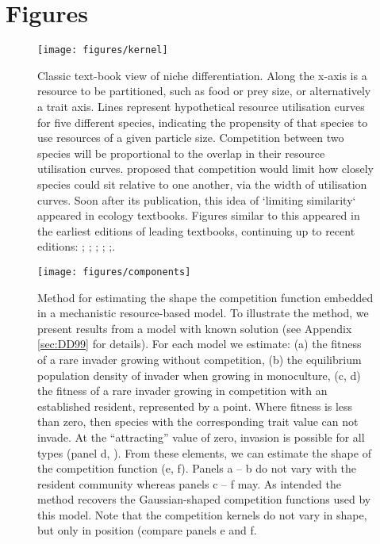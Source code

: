 \documentclass[a4paper,11pt]{article}
\begin{document}
\section{Figures}

\begin{figure}[h]
  \centering
  \texttt{[image: figures/kernel]}
  \caption{Classic text-book view of niche differentiation.  Along the
    x-axis is a resource to be partitioned, such as food or prey size,
    or alternatively a trait axis.  Lines represent hypothetical
    resource utilisation curves for five different species, indicating
    the propensity of that species to use resources of a given particle size.
    Competition between two species will be proportional to
    the overlap in their resource utilisation
    curves. \citet{MacArthur-1967} proposed that competition would
    limit how closely species could sit relative to one another, via
    the width of utilisation curves. Soon after its publication,
    this idea of `limiting similarity` appeared in ecology textbooks.
    Figures similar to this appeared in the earliest
    editions of leading textbooks, continuing up to recent editions:
    \citet[Fig. 7.9]{Begon-1986}; \citet[Fig. 8.29]{Begon-2006};
    \citet[Fig. 12.20]{Krebs-1978}; \citet[????]{ Krebs-2013};
    \citet[Fig. 36.13]{Ricklefs-1973};\citet[Fig. 29.19]{Ricklefs-1999}.}
  \label{fig:competition-kernels}
\end{figure}

\begin{figure}[h]
 \centering
 \texttt{[image: figures/components]}
 \caption{Method for estimating the shape the competition function
   embedded in a mechanistic resource-based model. To illustrate the
   method, we present results from a model with known solution
   \citep{Dieckmann-1999} (see Appendix \ref{sec:DD99} for
   details). For each model we estimate: (a) the fitness of a rare
   invader growing without competition, (b) the equilibrium population
   density of invader when growing in monoculture, (c, d) the fitness
   of a rare invader growing in competition with an established
   resident, represented by a point.  Where fitness is less than zero,
   then species with the corresponding trait value can not invade.  At
   the ``attracting'' value of zero, invasion is possible for all
   types (panel d, \citealt{Dieckmann-1999}).  From these elements, we
   can estimate the shape of the competition function (e, f).  Panels
   a -- b do not vary with the resident community whereas panels c --
   f may.
   As intended the method recovers the Gaussian-shaped competition
   functions used by this model.  Note that the competition kernels do
   not vary in shape, but only in position (compare panels e and f.}
  \label{fig:components}
\end{figure}
\end{document}
